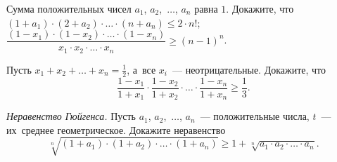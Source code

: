 \begin{problems}

\item
Сумма положительных чисел $a_1$, $a_2$,~$\ldots$, $a_n$ равна $1$.
Докажите, что
\\[0.3ex]
\sp
\(
    (1 + a_1) \cdot (2 + a_2)
    \cdot \ldots \cdot
    (n + a_n)
\leq
    2 \cdot n!
\)\;;
\\[1ex]
\sp
\(
    \dfrac{
        (1 - x_1) \cdot (1 - x_2) \cdot \ldots \cdot (1 - x_n)
    }{
        x_1 \cdot x_2 \cdot \ldots \cdot x_n
    }
\geq
    (n - 1)^n
\)\;.

\item
Пусть $x_1 + x_2 + \ldots + x_n = \frac{1}{2}$, а~все $x_i$~---
неотрицательные.
Докажите, что
\[
    \frac{1 - x_1}{1 + x_1} \cdot \frac{1 - x_2}{1 + x_2}
    \cdot \ldots \cdot
    \frac{1 - x_n}{1 + x_n}\geqslant\frac{1}{3}.
\]

\item\emph{Неравенство Гюйгенса.}
Пусть $a_1$, $a_2$,~$\ldots$, $a_n$~--- положительные числа, $t$~--- их~среднее
геометрическое.
Докажите неравенство
\[
    \sqrt[n]{
        (1 + a_1) \cdot (1 + a_2) \cdot \ldots \cdot (1 + a_n)
    }
\geq
    1 + \sqrt[n]{a_1 \cdot a_2 \cdot \ldots \cdot a_n}
.\]

\end{problems}

